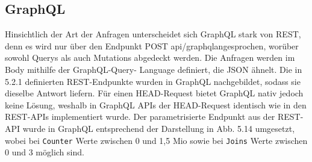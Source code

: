 
\subsection{GraphQL}
Hinsichtlich der Art der Anfragen unterscheidet sich GraphQL stark von REST, denn es wird nur über den Endpunkt \colorbox{gray!20}{POST api/graphql}angesprochen, worüber sowohl Querys als auch Mutations abgedeckt werden. Die Anfragen werden im Body mithilfe der GraphQL-Query- Language definiert, die JSON ähnelt. Die in 5.2.1 definierten REST-Endpunkte wurden in GraphQL nachgebildet, sodass sie dieselbe Antwort liefern. Für einen HEAD-Request bietet GraphQL nativ jedoch keine Lösung, weshalb in GraphQL APIs der HEAD-Request identisch wie in den REST-APIs implementiert wurde. Der parametrisierte Endpunkt aus der REST-API wurde in GraphQL entsprechend der Darstellung in Abb. 5.14 umgesetzt, wobei bei \texttt{Counter} Werte zwischen 0 und 1,5 Mio sowie bei  \texttt{Joins} Werte zwischen 0 und 3 möglich sind.

